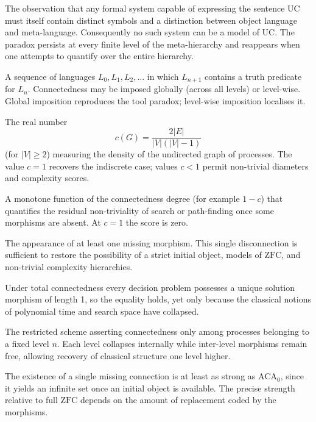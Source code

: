 \documentclass[11pt,a4paper]{article}
\theoremstyle{definition}
\begin{document}
\begin{description}[style=nextline, leftmargin=1.5cm]
\item[Tool paradox]
The observation that any formal system capable of expressing the sentence UC must itself contain distinct symbols and a distinction between object language and meta-language. Consequently no such system can be a model of UC. The paradox persists at every finite level of the meta-hierarchy and reappears when one attempts to quantify over the entire hierarchy.

\item[Meta-level / Meta-hierarchy]
A sequence of languages \(L_0,L_1,L_2,\dots\) in which \(L_{n+1}\) contains a truth predicate for \(L_n\). Connectedness may be imposed globally (across all levels) or level-wise. Global imposition reproduces the tool paradox; level-wise imposition localises it.

\item[Graded connectedness \(c(G)\)]
The real number
\[
c(G)=\frac{2|E|}{|V|(|V|-1)}
\]
(for \(|V|\ge 2\)) measuring the density of the undirected graph of processes. The value \(c=1\) recovers the indiscrete case; values \(c<1\) permit non-trivial diameters and complexity scores.

\item[Complexity score]
A monotone function of the connectedness degree (for example \(1-c\)) that quantifies the residual non-triviality of search or path-finding once some morphisms are absent. At \(c=1\) the score is zero.

\item[Symmetry breaking]
The appearance of at least one missing morphism. This single disconnection is sufficient to restore the possibility of a strict initial object, models of \(\mathrm{ZFC}\), and non-trivial complexity hierarchies.

\item[\(\mathrm{P}=\mathrm{NP}\) (degenerate reading)]
Under total connectedness every decision problem possesses a unique solution morphism of length 1, so the equality holds, yet only because the classical notions of polynomial time and search space have collapsed.

\item[Level-wise connectedness \(\mathrm{UC}_n\)]
The restricted scheme asserting connectedness only among processes belonging to a fixed level \(n\). Each level collapses internally while inter-level morphisms remain free, allowing recovery of classical structure one level higher.

\item[Reverse-mathematical strength]
The existence of a single missing connection is at least as strong as \(\mathrm{ACA}_0\), since it yields an infinite set once an initial object is available. The precise strength relative to full \(\mathrm{ZFC}\) depends on the amount of replacement coded by the morphisms.

\end{description}
\clearpage
\end{document}
